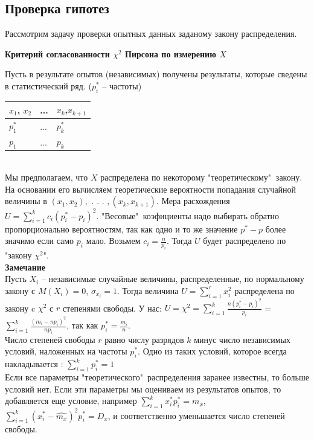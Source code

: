 \documentclass[russian, 12pt, fleqn]{article}
\begin{document}
\subsection{Проверка гипотез}
Рассмотрим задачу проверки опытных данных заданому закону распределения.
\begin{center}\textbf{Критерий согласованности $\chi^2$ Пирсона по измерению $X$}\end{center}
Пусть в результате опытов (независимых) получены результаты, которые сведены в статистический ряд. ($p_i^*$ -- частоты)\\
\begin{tabular}[b]{ | l |  l | l |    }
\hline
$x_1$, $x_2$ &... &$ x_k$,$x_{k+1}$\\
\hline
$p^*_1$&...&$p^*_k$\\
\hline
$p_1$& ... &$p_k$\\
\hline
\end{tabular}\\
Мы предполагаем, что $X$ распределена по некоторому "теоретическому"$\ $ закону. На основании его вычисляем теоретические вероятности попадания случайной величины в $(x_1,x_2),$ . . . $,(x_k, x_{k+1})$. Мера расхождения $U = \displaystyle{\sum \limits_{i = 1} ^ {k}} c_i(p_i^* - p_i)^2$. 
"Весовые"\  коэфициенты надо выбирать обратно пропорционально  вероятностям, так как одно и то же значение $p^*-p$ более значимо  если само $p_i$ мало. Возьмем $c_i=\frac{n}{p_i}$. Тогда $U$ будет распределено по "закону $\chi^2$".\\
\textbf{Замечание\ } \\
Пусть $X_i$ -- независимые случайные величины, распределенные, по нормальному закону с $M(X_i) = 0$, $\sigma_{x_i} = 1$. Тогда величина $U = \displaystyle{\sum \limits_{i  = 1}^{r}} x_i^2$ распределена по закону c $\chi^2$ с $r$ степенями свободы. У нас: $U = \chi^2 = \displaystyle{\sum \limits_{i = 1}^{k}} \frac{n(p_i^* - p_i)^2}{p_i}$ = $\displaystyle{\sum \limits_{i = 1}^{k}} \frac{(m_i - np_i)^2}{n p_i}$,  так как $p_i^* = \frac{m_i}{n}$.\\
Число степеней свободы $r$ равно числу разрядов $k$ минус число независимых условий, наложенных на частоты $p_i^*$. Одно из таких условий, которое всегда накладывается : $\displaystyle{\sum \limits _{i = 1} ^ {k}} p_i^* = 1$\\
Если все параметры "теоретического"\ распределения заранее известны, то больше условий нет. Если эти параметры мы оцениваем из результатов опытов, то добавляется еще условие, например $\displaystyle{\sum \limits_{i = 1} ^ {k}} x_i^* p_i^* = m_x$, $\displaystyle{\sum \limits_{i = 1} ^ {k}}( x_i^* - \hat{m_x} )^2 p_i^* = D_x$, и соответственно уменьшается число степеней свободы.\\
\end{document}
